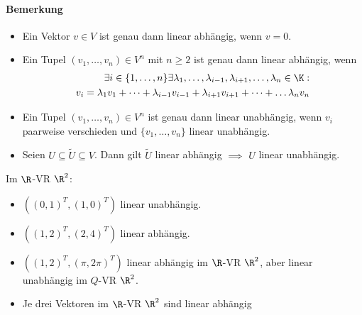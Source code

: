 \paragraph{Bemerkung}
\begin{itemize}
	\item Ein Vektor $v\in V$ ist genau dann linear abhängig, wenn $v=0$.
	\item Ein Tupel $(v_1,\dots, v_n)\in V^n$ mit $n\geq 2$ ist genau dann linear abhängig, wenn
	\begin{align*}
		\exists i \in \{1,\dots,n\} \exists \lambda_1,\dots,\lambda_{i-1},\lambda_{i+1},\dots, \lambda_n\in \K:\\ v_i = \lambda_1v_1+\dots + \lambda_{i-1}v_{i-1}+\lambda_{i+1}v_{i+1}+\dots + \dots \lambda_nv_n
	\end{align*}
	\item Ein Tupel $(v_1, \dots, v_n)\in V^n$ ist genau dann linear unabhängig, wenn $v_i$ paarweise verschieden und $\{v_1,\dots,v_n\}$ linear unabhängig.
	\item Seien $U\subseteq \tilde{U}\subseteq V$. Dann gilt $\tilde{U}$ linear abhängig $\implies$ $U$ linear unabhängig. 
\end{itemize}
\begin{example}
	Im $\R$-VR $\R^2$:
	\begin{itemize}
		\item $((0,1)^T, (1,0)^T)$ linear unabhängig.
		\item $((1,2)^T, (2,4)^T)$ linear abhängig.
		\item $((1,2)^T, (\pi, 2\pi)^T)$ linear abhängig im $\R$-VR $\R^2$, aber linear unabhängig im $Q$-VR $\R^2$.
		\item Je drei Vektoren im $\R$-VR $\R^2$ sind linear abhängig
	\end{itemize}
\end{example}
